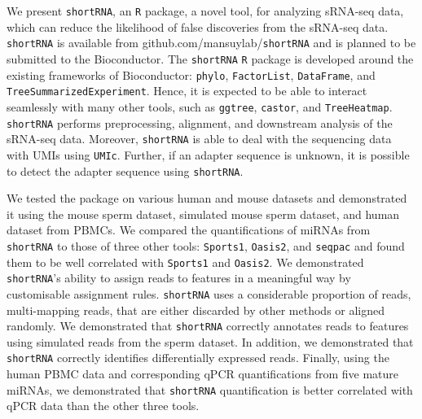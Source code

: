 \documentclass[12pt,twoside]{reedthesis}
\begin{document}
We present \texttt{shortRNA}, an \texttt{R} package, a novel tool, for analyzing sRNA-seq
data, which can reduce the likelihood of false discoveries from the
sRNA-seq data. \texttt{shortRNA} is available from github.com/mansuylab/\texttt{shortRNA}
and is planned to be submitted to the Bioconductor. The \texttt{shortRNA} \texttt{R}
package is developed around the existing frameworks of Bioconductor:
\texttt{phylo}, \texttt{FactorList}, \texttt{DataFrame}, and \texttt{TreeSummarizedExperiment}. Hence, it is
expected to be able to interact seamlessly with many other tools, such
as \texttt{ggtree}, \texttt{castor}, and \texttt{TreeHeatmap}. \texttt{shortRNA} performs preprocessing,
alignment, and downstream analysis of the sRNA-seq data. Moreover,
\texttt{shortRNA} is able to deal with the sequencing data with UMIs using \texttt{UMIc}.
Further, if an adapter sequence is unknown, it is possible to detect the
adapter sequence using \texttt{shortRNA}.

We tested the package on various human and mouse datasets and
demonstrated it using the mouse sperm dataset, simulated mouse sperm
dataset, and human dataset from PBMCs. We compared the quantifications
of miRNAs from \texttt{shortRNA} to those of three other tools: \texttt{Sports1}, \texttt{Oasis2},
and \texttt{seqpac} and found them to be well correlated with \texttt{Sports1} and \texttt{Oasis2}.
We demonstrated \texttt{shortRNA}'s ability to assign reads to features in a
meaningful way by customisable assignment rules. \texttt{shortRNA} uses a
considerable proportion of reads, multi-mapping reads, that are either
discarded by other methods or aligned randomly. We demonstrated that
\texttt{shortRNA} correctly annotates reads to features using simulated reads
from the sperm dataset. In addition, we demonstrated that \texttt{shortRNA}
correctly identifies differentially expressed reads. Finally, using the
human PBMC data and corresponding qPCR quantifications from five mature
miRNAs, we demonstrated that \texttt{shortRNA} quantification is better
correlated with qPCR data than the other three tools.
\end{document}

